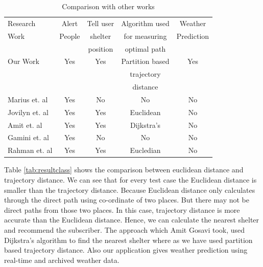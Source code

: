 \documentclass[conference]{IEEEtran}
\begin{document}
\begin{table}[htp]
\centering
\caption{Comparison with other works }

\begin{tabular}{|l|c|c|c|c|}
\hline
Research& Alert & Tell user  & Algorithm used  & Weather  \\
Work & People & shelter & for measuring & Prediction\\
& & position & optimal path & \\
\hline
Our Work & Yes & Yes & Partition based& Yes \\
& & & trajectory & \\
& & &distance & \\
\hline

Marius et. al\cite{cioca2008sms} & Yes & No & No & No \\
\hline
Jovilyn et. al\cite{fajardo2010implementation} & Yes & Yes & Euclidean & No \\
\hline

Amit et. al\cite{amit2014} & Yes & Yes & Dijkstra's & No \\
\hline

Gamini et. al\cite{jayasinghe2006gsm} & Yes & No & No & No \\
\hline

Rahman et. al\cite{rahman2012location} & Yes & Yes & Eucledian & No \\
\hline

\end{tabular}
\label{tab:comparison}
\end{table}

Table \ref{tab:resultclass} shows the comparison between euclidean distance and trajectory distance. We can see that for every test case the Euclidean distance is smaller than the trajectory distance. Because Euclidean distance only calculates through the direct path using co-ordinate of two places. But there may not be direct paths from those two places. In this case, trajectory distance is more accurate than the Euclidean distance. Hence, we can calculate the nearest shelter and recommend the subscriber. The approach which Amit Gosavi \cite{amit2014} took, used Dijkstra's algorithm to find the nearest shelter where as we have used partition based trajectory distance. Also our application gives weather prediction using real-time and archived weather data.
\end{document}
